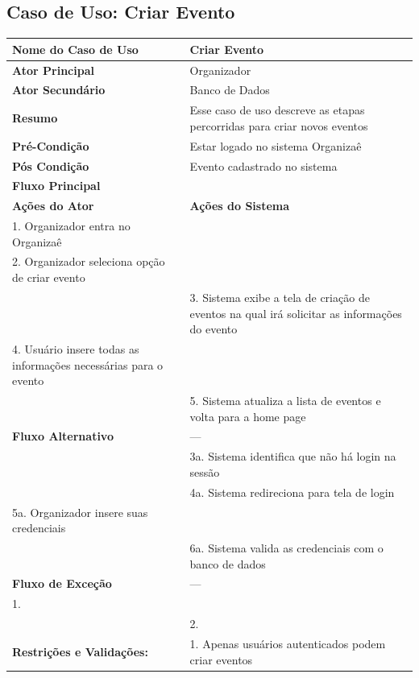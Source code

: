 \documentclass[12pt,a4paper]{article}
\begin{document}
\subsection{Caso de Uso: Criar Evento}
\begin{longtable}{|p{4cm}|p{11cm}|}
\hline
\textbf{Nome do Caso de Uso} & Criar Evento \\ \hline
\textbf{Ator Principal} & Organizador \\ \hline
\textbf{Ator Secundário} & Banco de Dados \\ \hline
\textbf{Resumo} & Esse caso de uso descreve as etapas percorridas para criar novos eventos \\ \hline
\textbf{Pré-Condição} & Estar logado no sistema Organizaê \\ \hline
\textbf{Pós Condição} & Evento cadastrado no sistema \\ \hline
\textbf{Fluxo Principal} & \\ \hline
\textbf{Ações do Ator} & \textbf{Ações do Sistema} \\ \hline
1. Organizador entra no Organizaê & \\ \hline
2. Organizador seleciona opção de criar evento & \\ \hline
& 3. Sistema exibe a tela de criação de eventos na qual irá solicitar as informações do evento \\ \hline
4. Usuário insere todas as informações necessárias para o evento & \\ \hline
& 5. Sistema atualiza a lista de eventos e volta para a home page \\ \hline
\textbf{Fluxo Alternativo} & --- \\ \hline
& 3a. Sistema identifica que não há login na sessão \\ \hline
& 4a. Sistema redireciona para tela de login \\ \hline
5a. Organizador insere suas credenciais & \\ \hline
& 6a. Sistema valida as credenciais com o banco de dados \\ \hline
\textbf{Fluxo de Exceção} & --- \\ \hline
1. & \\ \hline
& 2. \\ \hline
\textbf{Restrições e Validações:} & 1. Apenas usuários autenticados podem criar eventos \\ \hline
\end{longtable}

\vspace{1cm}
\end{document}
